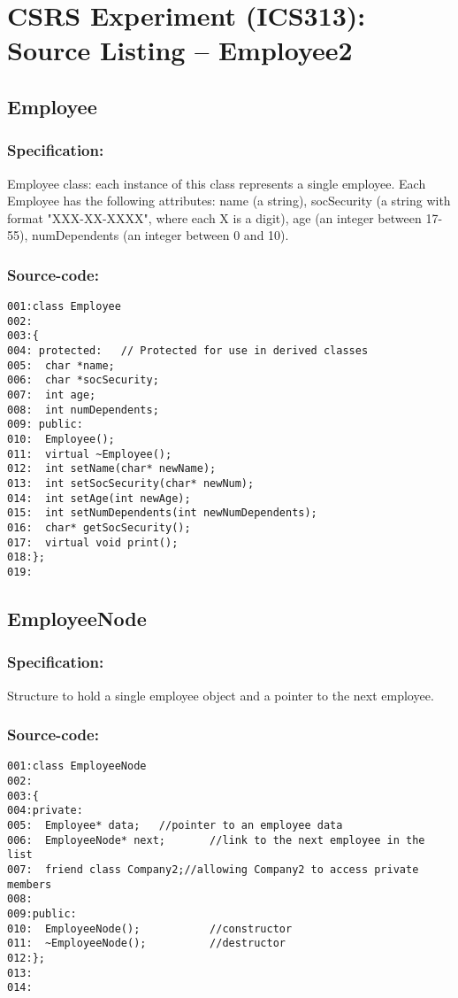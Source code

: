 
\chapter {CSRS Experiment (ICS313): Source Listing -- Employee2}
\small
	  

\section{Employee}
\subsection*{Specification:}
Employee class: each instance of this class represents a single
employee. Each Employee has the following attributes: name (a string),
socSecurity (a string with format "XXX-XX-XXXX", where each X is a digit),
age (an integer between 17-55), numDependents (an integer between 0 and 10).
\subsection*{Source-code:}
\begin{verbatim}
001:class Employee
002:
003:{
004: protected:   // Protected for use in derived classes
005:  char *name;
006:  char *socSecurity;
007:  int age;
008:  int numDependents;
009: public:
010:  Employee();
011:  virtual ~Employee();
012:  int setName(char* newName);
013:  int setSocSecurity(char* newNum);
014:  int setAge(int newAge);
015:  int setNumDependents(int newNumDependents);
016:  char* getSocSecurity();
017:  virtual void print();
018:};
019:
\end{verbatim}
\section{EmployeeNode}
\subsection*{Specification:}
Structure to hold a single employee object and a pointer to the next
employee.
\subsection*{Source-code:}
\begin{verbatim}
001:class EmployeeNode
002:
003:{
004:private:
005:  Employee* data;   //pointer to an employee data
006:  EmployeeNode* next;       //link to the next employee in the list
007:  friend class Company2;//allowing Company2 to access private members
008:
009:public:
010:  EmployeeNode();           //constructor
011:  ~EmployeeNode();          //destructor
012:};
013:
014:
\end{verbatim}
